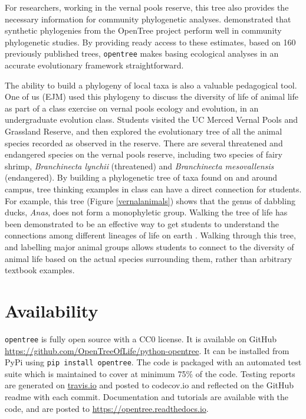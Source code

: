 \documentclass[oupdraft]{sysbio_sse}
\begin{document}
For researchers, working in the vernal pools reserve, this tree also provides the necessary information for community phylogenetic analyses. \citet{li_for_2019} demonstrated that synthetic phylogenies from the OpenTree project perform well in community phylogenetic studies. By providing ready access to these estimates, based on 160 previously published trees, \texttt{opentree} makes basing ecological analyses in an accurate evolutionary framework straightforward.


The ability to build a phylogeny of local taxa is also a valuable pedagogical tool. One of us (EJM) used this phylogeny to discuss the diversity of life of animal life as part of a class exercise on vernal pools ecology and evolution, in an undergraduate evolution class.
Students visited the UC Merced Vernal Pools and Grassland Reserve, and then explored the evolutionary tree of all the animal species recorded as observed in the reserve.
There are several threatened and endangered species on the vernal pools reserve, including two species of fairy shrimp, \textit{Branchinecta lynchii} (threatened) and \textit{Branchinecta mesovallensis} (endangered).
By building a phylogenetic tree of taxa found on and around campus, tree thinking examples in class can have a direct connection for students. For example, this tree (Figure \ref{vernalanimals}) shows that the genus of dabbling ducks, \textit{Anas}, does not form a monophyletic group. Walking the tree of life has been demonstrated to be an effective way to get students to understand the connections among different lineages of life on earth \citep{ballen_walking_2017}. Walking through this tree, and labelling major animal groups allows students to connect to the diversity of animal life based on the actual species surrounding them, rather than arbitrary textbook examples.



\section{Availability}
\label{sec5}

\texttt{opentree} is fully open source with a CC0 license. It is available on GitHub \url{ https://github.com/OpenTreeOfLife/python-opentree}. It can be installed from PyPi using \texttt{pip install opentree}. The code is packaged with an automated test suite which is maintained to cover at minimum 75\% of the code. Testing reports are generated on \url{travis.io} and posted to {codecov.io} and reflected on the GitHub readme with each commit. Documentation and tutorials are available with the code, and are posted to \url{https://opentree.readthedocs.io}.
\end{document}
